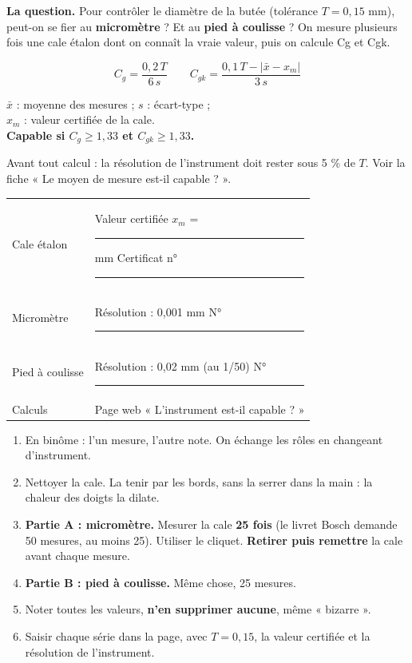 \documentclass[10pt,a4paper]{article}
\begin{document}
\thispagestyle{fancy}

\begin{tcolorbox}[boite]
\textbf{La question.} Pour contrôler le diamètre de la butée (tolérance $T = 0{,}15$ mm), peut-on se fier au \textbf{micromètre} ? Et au \textbf{pied à coulisse} ?
On mesure plusieurs fois une cale étalon dont on connaît la vraie valeur, puis on calcule Cg et Cgk.
\end{tcolorbox}

\begin{minipage}[c]{0.52\linewidth}
\[C_g=\frac{0{,}2\,T}{6\,s}\qquad C_{gk}=\frac{0{,}1\,T-\lvert\bar x-x_m\rvert}{3\,s}\]
\end{minipage}\hfill
\begin{minipage}[c]{0.45\linewidth}\small
$\bar x$ : moyenne des mesures ; $s$ : écart-type ;\\ $x_m$ : valeur certifiée de la cale.\\
\textbf{Capable si $C_g \ge 1{,}33$ et $C_{gk} \ge 1{,}33$.}
\end{minipage}

{\small Avant tout calcul : la résolution de l'instrument doit rester sous 5 \% de $T$. Voir la fiche « Le moyen de mesure est-il capable ? ».}

\renewcommand{\arraystretch}{1.35}
\begin{tabularx}{\linewidth}{@{}l X@{}}
Cale étalon & Valeur certifiée $x_m$ = \rule{25mm}{0.3pt} mm \quad Certificat n° \rule{25mm}{0.3pt}\\
Micromètre & Résolution : 0,001 mm \quad N° \rule{25mm}{0.3pt}\\
Pied à coulisse & Résolution : 0,02 mm (au 1/50) \quad N° \rule{25mm}{0.3pt}\\
Calculs & Page web « L'instrument est-il capable ? »\\
\end{tabularx}

\begin{enumerate}[label=\textcolor{cyan}{\textbf{\arabic*.}},leftmargin=15pt]
\item En binôme : l'un mesure, l'autre note. On échange les rôles en changeant d'instrument.
\item Nettoyer la cale. La tenir par les bords, sans la serrer dans la main : la chaleur des doigts la dilate.
\item \textbf{Partie A : micromètre.} Mesurer la cale \textbf{25 fois} (le livret Bosch demande 50 mesures, au moins 25). Utiliser le cliquet. \textbf{Retirer puis remettre} la cale avant chaque mesure.
\item \textbf{Partie B : pied à coulisse.} Même chose, 25 mesures.
\item Noter toutes les valeurs, \textbf{n'en supprimer aucune}, même « bizarre ».
\item Saisir chaque série dans la page, avec $T = 0{,}15$, la valeur certifiée et la résolution de l'instrument.
\end{enumerate}
\end{document}
